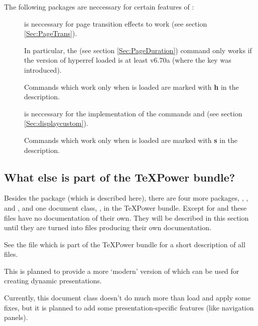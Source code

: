 \documentclass[12pt]{scrartcl}
\let\newslide=\relax
\begin{document}
The following packages are neccessary for certain features of :
\begin{description}
\item[]
  is neccessary for page transition effects to work (see section
  \ref{Sec:PageTrans}).

  In particular, the  (see section \ref{Sec:PageDuration}) command only works if the version of
  hyperref loaded is at least v6.70a (where the  key was introduced).

  Commands which work only when  is loaded are marked with \textbf{\textsf{h}} in the description.

\newslide

\item[]
  is neccessary for the implementation of the commands  and
   (see section \ref{Sec:displaycustom}).

  Commands which work only when  is loaded are marked with \textbf{\textsf{s}} in the description.
\end{description}

\newslide

\subsection{What else is part of the \TeX Power bundle?}
Besides the package  (which is described here), there are four
more packages, , ,  and
, and one document class, , in the \TeX Power bundle.
Except for  and  these files have no documentation
of their own. They will be described in this section until they are turned
into  files producing their own documentation.

See the file  which is part of the \TeX Power bundle for a short description of all files.

\newslide

This is planned to provide a more `modern' version of  which can be used for creating dynamic
presentations.

Currently, this document class doesn't do much more than load  and apply some fixes, but it is planned to
add some presentation-specific features (like navigation panels).
\end{document}
